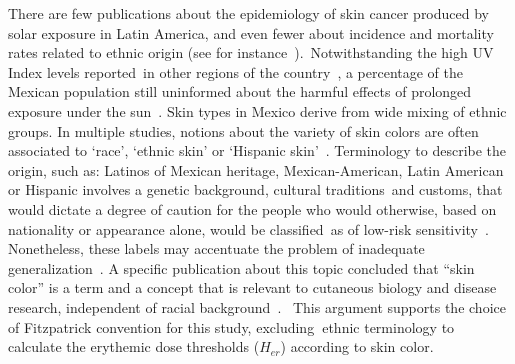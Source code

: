 \documentclass{article}
\begin{document}
There are few publications about the epidemiology of skin cancer
produced by solar exposure in Latin America, and even fewer about
incidence and mortality rates related to ethnic origin (see for
instance~\cite{de_Vries_2016}).~Notwithstanding the high UV Index levels
reported~in other regions of the country~\cite{moscoso2012}, a
percentage of the Mexican population still uninformed about the harmful
effects of prolonged exposure under the sun~\cite{b2006}. Skin
types in Mexico derive from wide mixing of ethnic groups. In multiple
studies, notions about the variety of skin colors are often associated
to `race', `ethnic skin' or `Hispanic skin'~\cite{2005,Del_Bino_2013,Robinson_2017}.
Terminology to describe the origin, such as: Latinos of Mexican
heritage, Mexican-American, Latin American or Hispanic involves a
genetic background, cultural traditions~and customs, that would dictate
a degree of caution for the people who would otherwise, based on
nationality or appearance alone, would be classified~as of low-risk
sensitivity~\cite{de_Vries_2016,Wolbarsht1999,Lancer1998,Del_Bino_2013}. Nonetheless, these labels may accentuate
the problem of inadequate generalization~\cite{Cuevas_2016,Marcheco_Teruel_2014}. A specific
publication about this topic concluded that ``skin color'' is a term and
a concept that is relevant to cutaneous biology and disease research,
independent of racial background~\cite{Torres_2017}.~ This argument
supports the choice of Fitzpatrick convention for this study,
excluding\textbf{~}ethnic terminology to calculate the erythemic dose
thresholds (\(H_{er}\)) according to skin color.~
\end{document}
